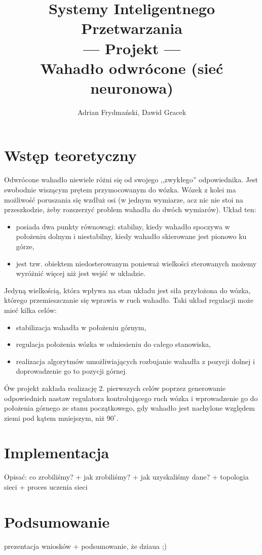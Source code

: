 \documentclass[10pt,a4paper,titlepage]{article}
\author{Adrian Frydmański, Dawid Gracek}
\title{Systemy Inteligentnego Przetwarzania\\--- Projekt ---\\Wahadło odwrócone (sieć neuronowa)}
\begin{document}
	\maketitle
	\clearpage
	\section{Wstęp teoretyczny}
	Odwrócone wahadło niewiele różni się od swojego ,,zwykłego'' odpowiednika. Jest swobodnie wiszącym prętem przymocowanym do wózka. Wózek z kolei ma możliwość poruszania się wzdłuż osi (w jednym wymiarze, acz nic nie stoi na przeszkodzie, żeby rozszerzyć problem wahadła do dwóch wymiarów). Układ ten:
	\begin{itemize}
		\item posiada dwa punkty równowagi: stabilny, kiedy wahadło spoczywa w położeniu dolnym i niestabilny, kiedy wahadło skierowane jest pionowo ku górze,
		\item jest tzw. obiektem niedosterowanym ponieważ wielkości sterowanych możemy wyróżnić więcej niż jest wejść w układzie.
	\end{itemize}
	
	Jedyną wielkością, która wpływa na stan układu jest siła przyłożona do wózka, którego przemieszczanie się wprawia w ruch wahadło. Taki układ regulacji może mieć kilka celów:
	\begin{itemize}
		\item stabilizacja wahadła w położeniu górnym,
		\item regulacja położenia wózka w odniesieniu do całego stanowiska,
		\item realizacja algorytmów umożliwiających rozbujanie wahadła z pozycji dolnej i doprowadzenie go to pozycji górnej.
	\end{itemize}
	
	Ów projekt zakłada realizację 2. pierwszych celów poprzez generowanie odpowiednich nastaw regulatora kontrolującego ruch wózka i wprowadzenie go do położenia górnego ze stanu początkowego, gdy wahadło jest nachylone względem ziemi pod kątem mniejszym, niż $90^\circ$.
	
	\section{Implementacja}	
	Opisać: co zrobiliśmy? + jak zrobiliśmy? + jak uzyskaliśmy dane? + topologia sieci + proces uczenia sieci
	
	\section{Podsumowanie}
	prezentacja wniosków + podsumowanie, że dziaua ;)
\end{document}
